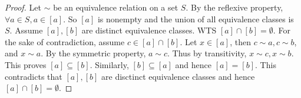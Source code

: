 \documentclass{article}
\newtheorem{theorem}{Theorem}[section]
\theoremstyle{definition}
\begin{document}
\noindent{}

\begin{proof}
    Let $\sim$ be an equivalence relation on a set $S$. By the reflexive property, $\forall a \in S, a \in [a]$. So $[a]$ is nonempty and the union of all equivalence classes is $S$. Assume $[a],[b]$ are distinct equivalence classes. WTS $[a] \cap [b]=\emptyset$. For the sake of contradiction, assume $c \in [a] \cap [b]$. Let $x \in [a]$, then $c \sim a, c \sim b$, and $x \sim a$. By the symmetric property, $a \sim c$. Thus by transitivity, $x \sim c,x \sim b$. This proves $[a] \subseteq [b]$. Similarly, $[b] \subseteq [a]$ and hence $[a]=[b]$. This contradicts that $[a],[b]$ are disctinct equivalence classes and hence $[a] \cap [b] =\emptyset$.
\end{proof}
\end{document}
